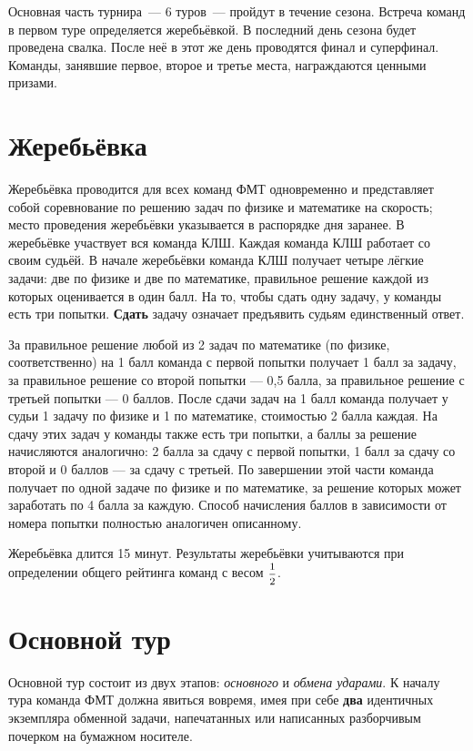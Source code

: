 \documentclass[12pt,a4paper]{article}
\begin{document}
Основная часть турнира~--- 6 туров~--- пройдут в течение сезона. Встреча команд в первом туре определяется жеребьёвкой. В последний день сезона будет проведена свалка. После неё в этот же день проводятся финал и суперфинал. Команды, занявшие первое, второе и третье места, награждаются ценными призами.

\section{Жеребьёвка}
Жеребьёвка проводится для всех команд ФМТ одновременно и представляет собой соревнование по решению задач по физике и математике на скорость; место проведения жеребьёвки указывается в распорядке дня заранее. В жеребьёвке участвует вся команда КЛШ. Каждая команда КЛШ работает со своим судьёй. В начале жеребьёвки команда КЛШ получает четыре лёгкие задачи: две по физике и две по математике, правильное решение каждой из которых оценивается в один балл. На то, чтобы сдать одну задачу, у команды есть три попытки. \textbf{Сдать} задачу означает предъявить судьям единственный ответ.

За правильное решение любой из 2 задач по математике (по физике, соответственно) на 1 балл команда с первой попытки получает 1 балл за задачу, за правильное решение со второй попытки --- 0,5 балла, за правильное решение с третьей попытки --- 0 баллов. После сдачи задач на 1 балл команда получает у судьи 1 задачу по физике и 1 по математике, стоимостью 2 балла каждая. На сдачу этих задач у команды также есть три попытки, а баллы за решение начисляются аналогично: 2 балла за сдачу с первой попытки, 1 балл за сдачу со второй и 0 баллов --- за сдачу с третьей. По завершении этой части команда получает по одной задаче по физике и по математике, за решение которых может заработать по 4 балла за каждую. Способ начисления баллов в зависимости от номера попытки полностью аналогичен описанному.

Жеребьёвка длится 15 минут. Результаты жеребьёвки учитываются при определении общего рейтинга команд с весом $\mfrac{1}{2}$.

\section{Основной тур}
Основной тур состоит из двух этапов: \textsl{основного} и \textsl{обмена ударами}. К началу тура команда ФМТ должна явиться вовремя, имея при себе {\bf два} идентичных экземпляра обменной задачи, напечатанных или написанных разборчивым почерком на бумажном носителе.
\end{document}
